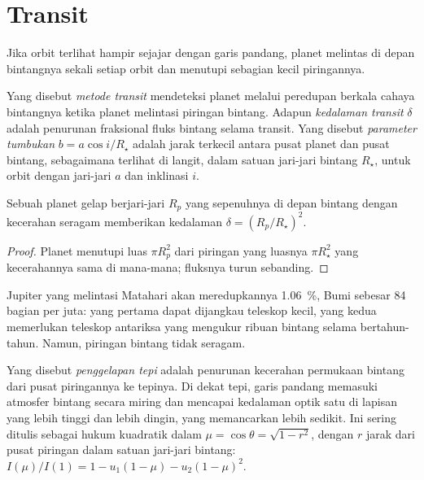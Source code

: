 \section{Transit}\label{sec:b3:exoplanets:transits}

Jika orbit terlihat hampir sejajar dengan garis pandang, planet melintas di depan
bintangnya sekali setiap orbit dan menutupi sebagian kecil piringannya.

\begin{definition}\label{def:b3:exoplanets:transit}
Yang disebut \emph{metode transit} mendeteksi planet melalui
peredupan berkala cahaya bintangnya ketika planet melintasi piringan bintang. Adapun
\emph{kedalaman transit} $\delta$ adalah
penurunan fraksional fluks bintang selama transit. Yang disebut \emph{parameter
tumbukan} $b = a\cos i/R_\star$ adalah
jarak terkecil antara pusat planet dan pusat bintang, sebagaimana terlihat
di langit, dalam satuan jari-jari bintang $R_\star$, untuk orbit dengan
jari-jari $a$ dan inklinasi $i$.
\end{definition}

\begin{proposition}\label{prop:b3:exoplanets:depth}
Sebuah planet gelap berjari-jari $R_p$ yang sepenuhnya di depan bintang dengan
kecerahan seragam memberikan kedalaman $\delta = (R_p/R_\star)^2$.
\end{proposition}

\begin{proof}
Planet menutupi luas $\pi R_p^2$ dari piringan yang luasnya $\pi R_\star^2$
yang kecerahannya sama di mana-mana; fluksnya turun sebanding.
\end{proof}

Jupiter yang melintasi Matahari akan meredupkannya \qty{1.06}{\percent}, Bumi
sebesar \num{84} bagian per juta: yang pertama dapat dijangkau teleskop kecil,
yang kedua memerlukan teleskop antariksa yang mengukur ribuan
bintang selama bertahun-tahun. Namun, piringan bintang tidak seragam.

\begin{definition}\label{def:b3:exoplanets:limb}
Yang disebut \emph{penggelapan tepi} adalah penurunan kecerahan permukaan
bintang dari pusat piringannya ke tepinya.
Di dekat tepi, garis pandang memasuki atmosfer bintang secara miring
dan mencapai kedalaman optik satu di lapisan yang lebih tinggi dan lebih dingin, yang memancarkan
lebih sedikit. Ini sering ditulis sebagai hukum kuadratik dalam $\mu = \cos\theta =
\sqrt{1 - r^2}$, dengan $r$ jarak dari pusat piringan dalam
satuan jari-jari bintang: $I(\mu)/I(1) = 1 - u_1(1 - \mu) - u_2(1 - \mu)^2$.
\end{definition}

